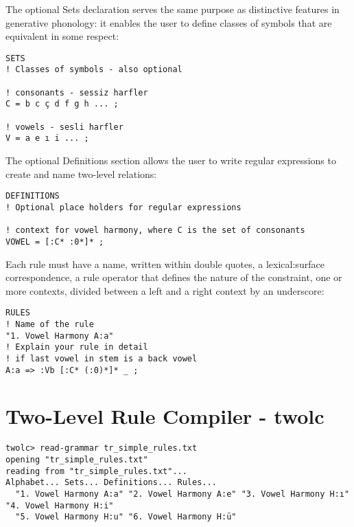 \documentclass[11pt,a4paper]{article}
\begin{document}
The optional Sets declaration serves the same purpose as distinctive features in generative phonology: it enables the user to define classes of symbols that are equivalent in some respect:\\
\begin{lstlisting}[belowskip=1em,frame=single]
SETS
! Classes of symbols - also optional

! consonants - sessiz harfler
C = b c ç d f g h ... ;

! vowels - sesli harfler
V = a e ı i ... ;

\end{lstlisting}

The optional Definitions section allows the user to write regular expressions to create and name two-level relations:\\
\begin{lstlisting}[belowskip=1em,frame=single]
DEFINITIONS
! Optional place holders for regular expressions

! context for vowel harmony, where C is the set of consonants
VOWEL = [:C* :0*]* ;

\end{lstlisting}

Each rule must have a name, written within double quotes, a lexical:surface correspondence, a rule operator that defines the nature of the constraint, one or more contexts, divided between a left and a right context by an underscore: \\
\begin{lstlisting}[belowskip=1em,frame=single]
RULES
! Name of the rule
"1. Vowel Harmony A:a" 
! Explain your rule in detail
! if last vowel in stem is a back vowel
A:a => :Vb [:C* (:0)*]* _ ;

\end{lstlisting}


\section{Two-Level Rule Compiler - twolc}


\begin{lstlisting}[caption={Read the grammar with two-level rules}, belowskip=1em,frame=single]
twolc> read-grammar tr_simple_rules.txt
opening "tr_simple_rules.txt"
reading from "tr_simple_rules.txt"...
Alphabet... Sets... Definitions... Rules...
  "1. Vowel Harmony A:a" "2. Vowel Harmony A:e" "3. Vowel Harmony H:ı" "4. Vowel Harmony H:i"
  "5. Vowel Harmony H:u" "6. Vowel Harmony H:ü"

\end{lstlisting}
\end{document}
